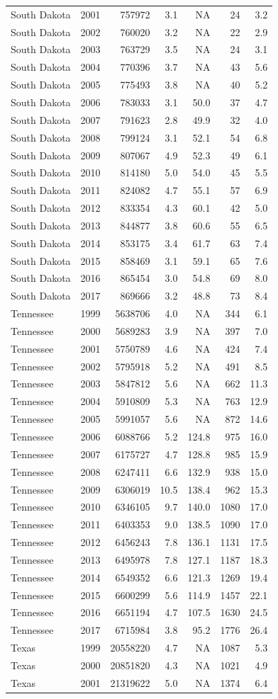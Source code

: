 \documentclass[
]{article}
\begin{document}
\begin{longtable}[]{@{}lrrrrrr@{}}
South Dakota & 2001 & 757972 & 3.1 & NA & 24 & 3.2\tabularnewline
South Dakota & 2002 & 760020 & 3.2 & NA & 22 & 2.9\tabularnewline
South Dakota & 2003 & 763729 & 3.5 & NA & 24 & 3.1\tabularnewline
South Dakota & 2004 & 770396 & 3.7 & NA & 43 & 5.6\tabularnewline
South Dakota & 2005 & 775493 & 3.8 & NA & 40 & 5.2\tabularnewline
South Dakota & 2006 & 783033 & 3.1 & 50.0 & 37 & 4.7\tabularnewline
South Dakota & 2007 & 791623 & 2.8 & 49.9 & 32 & 4.0\tabularnewline
South Dakota & 2008 & 799124 & 3.1 & 52.1 & 54 & 6.8\tabularnewline
South Dakota & 2009 & 807067 & 4.9 & 52.3 & 49 & 6.1\tabularnewline
South Dakota & 2010 & 814180 & 5.0 & 54.0 & 45 & 5.5\tabularnewline
South Dakota & 2011 & 824082 & 4.7 & 55.1 & 57 & 6.9\tabularnewline
South Dakota & 2012 & 833354 & 4.3 & 60.1 & 42 & 5.0\tabularnewline
South Dakota & 2013 & 844877 & 3.8 & 60.6 & 55 & 6.5\tabularnewline
South Dakota & 2014 & 853175 & 3.4 & 61.7 & 63 & 7.4\tabularnewline
South Dakota & 2015 & 858469 & 3.1 & 59.1 & 65 & 7.6\tabularnewline
South Dakota & 2016 & 865454 & 3.0 & 54.8 & 69 & 8.0\tabularnewline
South Dakota & 2017 & 869666 & 3.2 & 48.8 & 73 & 8.4\tabularnewline
Tennessee & 1999 & 5638706 & 4.0 & NA & 344 & 6.1\tabularnewline
Tennessee & 2000 & 5689283 & 3.9 & NA & 397 & 7.0\tabularnewline
Tennessee & 2001 & 5750789 & 4.6 & NA & 424 & 7.4\tabularnewline
Tennessee & 2002 & 5795918 & 5.2 & NA & 491 & 8.5\tabularnewline
Tennessee & 2003 & 5847812 & 5.6 & NA & 662 & 11.3\tabularnewline
Tennessee & 2004 & 5910809 & 5.3 & NA & 763 & 12.9\tabularnewline
Tennessee & 2005 & 5991057 & 5.6 & NA & 872 & 14.6\tabularnewline
Tennessee & 2006 & 6088766 & 5.2 & 124.8 & 975 & 16.0\tabularnewline
Tennessee & 2007 & 6175727 & 4.7 & 128.8 & 985 & 15.9\tabularnewline
Tennessee & 2008 & 6247411 & 6.6 & 132.9 & 938 & 15.0\tabularnewline
Tennessee & 2009 & 6306019 & 10.5 & 138.4 & 962 & 15.3\tabularnewline
Tennessee & 2010 & 6346105 & 9.7 & 140.0 & 1080 & 17.0\tabularnewline
Tennessee & 2011 & 6403353 & 9.0 & 138.5 & 1090 & 17.0\tabularnewline
Tennessee & 2012 & 6456243 & 7.8 & 136.1 & 1131 & 17.5\tabularnewline
Tennessee & 2013 & 6495978 & 7.8 & 127.1 & 1187 & 18.3\tabularnewline
Tennessee & 2014 & 6549352 & 6.6 & 121.3 & 1269 & 19.4\tabularnewline
Tennessee & 2015 & 6600299 & 5.6 & 114.9 & 1457 & 22.1\tabularnewline
Tennessee & 2016 & 6651194 & 4.7 & 107.5 & 1630 & 24.5\tabularnewline
Tennessee & 2017 & 6715984 & 3.8 & 95.2 & 1776 & 26.4\tabularnewline
Texas & 1999 & 20558220 & 4.7 & NA & 1087 & 5.3\tabularnewline
Texas & 2000 & 20851820 & 4.3 & NA & 1021 & 4.9\tabularnewline
Texas & 2001 & 21319622 & 5.0 & NA & 1374 & 6.4\tabularnewline

\end{longtable}
\end{document}
